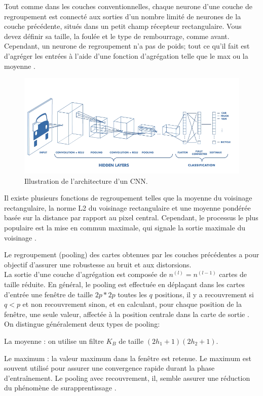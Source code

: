 	Tout comme dans les couches conventionnelles, chaque neurone d'une couche de regroupement est connecté aux sorties d'un nombre limité de neurones de la couche précédente, situés dans un petit champ récepteur rectangulaire. Vous devez définir sa taille, la foulée et le type de rembourrage, comme avant. Cependant, un neurone de regroupement n'a pas de poids; tout ce qu'il fait est d'agréger les entrées à l'aide d'une fonction d'agrégation telle que le max ou la moyenne \cite{geron2017hands}.
	
	\begin{figure}[H]%
		\centering
		\includegraphics[width=\textwidth]{images/cnn_complet}
		\caption{Illustration de l'architecture d'un CNN.}
		\label{fig:cnn_complet}
	\end{figure}
	
	Il existe plusieurs fonctions de regroupement telles que la moyenne du voisinage rectangulaire, la norme L2 du voisinage rectangulaire et une moyenne pondérée basée sur la distance par rapport au pixel central. Cependant, le processus le plus populaire est la mise en commun maximale, qui signale la sortie maximale du voisinage \cite{goodfellow2016deep}.
	
	Le regroupement (pooling) des cartes obtenues par les couches précédentes a pour objectif d'assurer une robustesse au bruit et aux distorsions.\\
	La sortie d'une couche d'agrégation est composée de $n^{(l)} = n^{(l - 1)}$ cartes de taille réduite. En général, le pooling est effectuée en déplaçant dans les cartes d'entrée une fenêtre de taille $2p * 2p$ toutes les $q$ positions, il y a recouvrement si $q < p$ et non recouvrement sinon, et en calculant, pour chaque position de la fenêtre, une seule valeur, affectée à la position centrale dans la carte de sortie \cite{antoine2018apprentissage}. On distingue généralement deux types de pooling:
	
	\begin{list}{--}{}
		\item La moyenne : on utilise un filtre $K_{B}$ de taille $(2h_{1} + 1)(2h_{2} + 1)$.
		\item Le maximum : la valeur maximum dans la fenêtre est retenue. Le maximum est souvent utilisé pour assurer une convergence rapide durant la phase d'entraînement. Le pooling avec recouvrement, il, semble assurer une réduction du phénomène de surapprentissage \cite{antoine2018apprentissage}.  
	\end{list}
	
